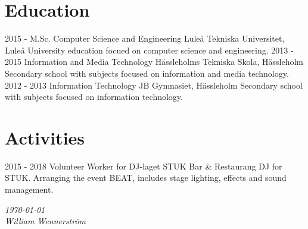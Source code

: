 \documentclass[]{friggeri-cv}
\begin{document}
\section{Education}
\begin{entrylist}
  \entry
    {2015 -}
    {M.Sc. Computer Science and Engineering}
    {Luleå Tekniska Universitet, Luleå}
    {University education focued on computer science and engineering.}
  \entry
    {2013 - 2015}
    {Information and Media Technology}
    {Hässleholms Tekniska Skola, Hässleholm}
    {Secondary school with subjects focused on information and media technology.}
  \entry
    {2012 - 2013}
    {Information Technology}
    {JB Gymnasiet, Hässleholm}
    {Secondary school with subjects focused on information technology.}
\end{entrylist}

\section{Activities}
\begin{entrylist}
    \entry
    {2015 - 2018}
    {Volunteer Worker for DJ-laget}
    {STUK Bar \& Restaurang}
    {DJ for STUK. Arranging the event BEAT, includes stage lighting, effects and sound management.}
\end{entrylist}

\begin{flushright}
\emph{\today} \\
\emph{William Wennerström}
\end{flushright}
\end{document}
